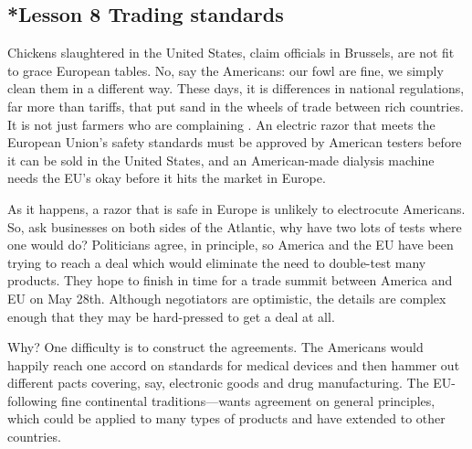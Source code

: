 \documentclass[kindlepaper]{BHCexam4kindle}
\begin{document}
\subsection{*Lesson 8
Trading standards}
\par
Chickens slaughtered in the United States, claim officials in Brussels, are not fit to grace European tables. No,
say the Americans: our fowl are fine, we simply clean them in a different way. These days, it is differences in
national regulations, far more than tariffs, that put sand in the wheels of trade between rich countries. It is not
just farmers who are complaining . An electric razor that meets the European Union's safety standards must be
approved by American testers before it can be sold in the United States, and an American-made dialysis machine
needs the EU's okay before it hits the market in Europe.
\par
As it happens, a razor that is safe in Europe is unlikely to electrocute Americans. So, ask businesses on both
sides of the Atlantic, why have two lots of tests where one would do? Politicians agree, in principle, so America
and the EU have been trying to reach a deal which would eliminate the need to double-test many products. They
hope to finish in time for a trade summit between America and EU on May 28th. Although negotiators are
optimistic, the details are complex enough that they may be hard-pressed to get a deal at all.
\par
Why? One difficulty is to construct the agreements. The Americans would happily reach one accord on
standards for medical devices and then hammer out different pacts covering, say, electronic goods and drug
manufacturing. The EU-following fine continental traditions—wants agreement on general principles, which
could be applied to many types of products and have extended to other countries.
\clearpage
\end{document}
